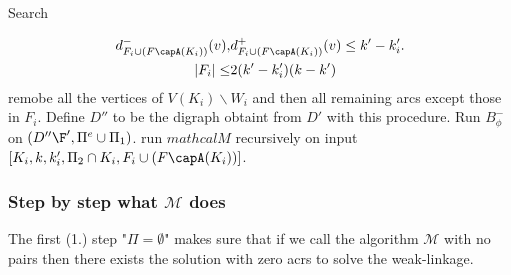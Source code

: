 \documentclass{beamer}
\begin{document}
\begin{frame}[allowframebreaks]{Search}
\begin{algorithmic}[1]
{\begin{align}
                        d^-_{F_i\cup(F\capA(K_i))}(v),&d^+_{F_i\cup(F\capA(K_i))}(v)\leq k'-k'_i.\\
                        |F_i|\leq &2(k'-k'_i)(k-k')
                    \end{align}}
                            \STATE remobe all the vertices of $V(K_i)\backslash W_i$ and then all remaining arcs except those in $F_i$.
                        \ENDFOR
                        \STATE Define $D''$ to be the digraph obtaint from $D'$ with this procedure.
                        \STATE Run $B_{\phi}^-$ on $(D''\F',\Pi^e\cup\Pi_1)$.
                            \STATE run $mathcal{M}$ recursively on input $[K_i,k,k'_i,\Pi_2\cap K_i,F_i\cup(F\capA(K_i))]$.
                        \ENDFOR 
                    \ENDFOR
                \ENDIF
            \ENDFOR 
        \end{algorithmic}
\end{frame}


\begin{frame}
    \frametitle{Step by step what $\mathcal{M}$ does}
    The first (1.) step "$\Pi=\emptyset$" makes sure that if we call the algorithm $\mathcal{M}$ with no pairs then there exists the solution with zero acrs to solve the weak-linkage. 
    
\end{frame}

%    



\end{document}
